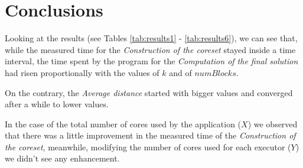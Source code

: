 \documentclass[10pt]{article}
\begin{document}
\section{Conclusions}

Looking at the results (see Tables \ref{tab:results1} - \ref{tab:results6}), we can see that, while the measured time for the \textit{Construction of the coreset} stayed inside a time interval, the time spent by the program for the \textit{Computation of the final solution} had risen proportionally with the values of $k$ and of $numBlocks$.

On the contrary, the \textit{Average distance} started with bigger values and converged after a while to lower values.

In the case of the total number of cores used by the application ($X$) we observed that there was a little improvement in the measured time of the \textit{Construction of the coreset}, meanwhile, modifying the number of cores used for each executor ($Y$) we didn't see any enhancement.






 
\end{document}
